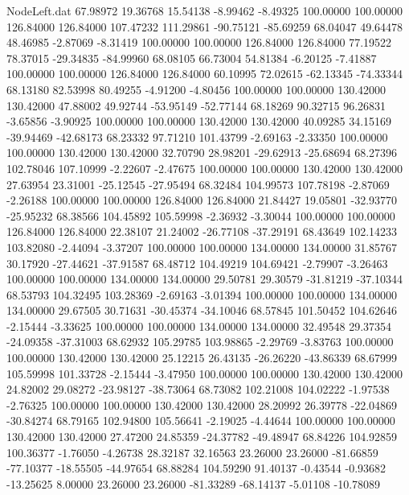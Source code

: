 \begin{filecontents}{NodeLeft.dat}
  67.98972   19.36768   15.54138    -8.99462   -8.49325  100.00000  100.00000  126.84000  126.84000  107.47232  111.29861  -90.75121  -85.69259
  68.04047   49.64478   48.46985    -2.87069   -8.31419  100.00000  100.00000  126.84000  126.84000   77.19522   78.37015  -29.34835  -84.99960
  68.08105   66.73004   54.81384    -6.20125   -7.41887  100.00000  100.00000  126.84000  126.84000   60.10995   72.02615  -62.13345  -74.33344
  68.13180   82.53998   80.49255    -4.91200   -4.80456  100.00000  100.00000  130.42000  130.42000   47.88002   49.92744  -53.95149  -52.77144
  68.18269   90.32715   96.26831    -3.65856   -3.90925  100.00000  100.00000  130.42000  130.42000   40.09285   34.15169  -39.94469  -42.68173
  68.23332   97.71210  101.43799    -2.69163   -2.33350  100.00000  100.00000  130.42000  130.42000   32.70790   28.98201  -29.62913  -25.68694
  68.27396  102.78046  107.10999    -2.22607   -2.47675  100.00000  100.00000  130.42000  130.42000   27.63954   23.31001  -25.12545  -27.95494
  68.32484  104.99573  107.78198    -2.87069   -2.26188  100.00000  100.00000  126.84000  126.84000   21.84427   19.05801  -32.93770  -25.95232
  68.38566  104.45892  105.59998    -2.36932   -3.30044  100.00000  100.00000  126.84000  126.84000   22.38107   21.24002  -26.77108  -37.29191
  68.43649  102.14233  103.82080    -2.44094   -3.37207  100.00000  100.00000  134.00000  134.00000   31.85767   30.17920  -27.44621  -37.91587
  68.48712  104.49219  104.69421    -2.79907   -3.26463  100.00000  100.00000  134.00000  134.00000   29.50781   29.30579  -31.81219  -37.10344
  68.53793  104.32495  103.28369    -2.69163   -3.01394  100.00000  100.00000  134.00000  134.00000   29.67505   30.71631  -30.45374  -34.10046
  68.57845  101.50452  104.62646    -2.15444   -3.33625  100.00000  100.00000  134.00000  134.00000   32.49548   29.37354  -24.09358  -37.31003
  68.62932  105.29785  103.98865    -2.29769   -3.83763  100.00000  100.00000  130.42000  130.42000   25.12215   26.43135  -26.26220  -43.86339
  68.67999  105.59998  101.33728    -2.15444   -3.47950  100.00000  100.00000  130.42000  130.42000   24.82002   29.08272  -23.98127  -38.73064
  68.73082  102.21008  104.02222    -1.97538   -2.76325  100.00000  100.00000  130.42000  130.42000   28.20992   26.39778  -22.04869  -30.84274
  68.79165  102.94800  105.56641    -2.19025   -4.44644  100.00000  100.00000  130.42000  130.42000   27.47200   24.85359  -24.37782  -49.48947
  68.84226  104.92859  100.36377    -1.76050   -4.26738   28.32187   32.16563   23.26000   23.26000  -81.66859  -77.10377  -18.55505  -44.97654
  68.88284  104.59290   91.40137    -0.43544   -0.93682  -13.25625    8.00000   23.26000   23.26000  -81.33289  -68.14137   -5.01108  -10.78089

\end{filecontents}
